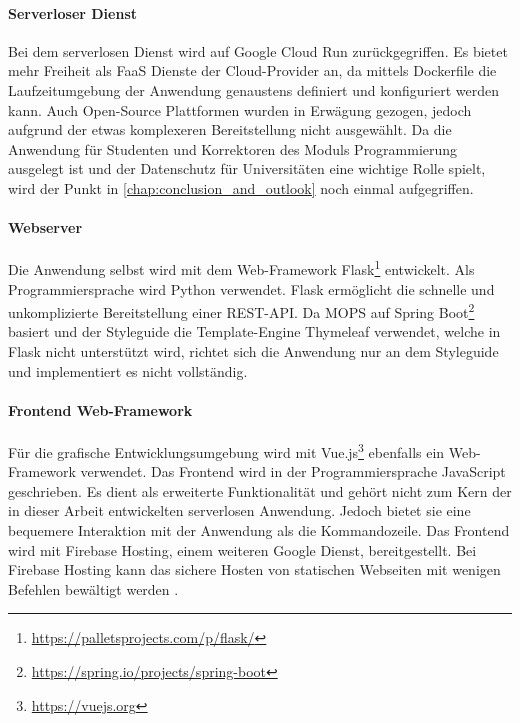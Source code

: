 \paragraph{Serverloser Dienst} Bei dem serverlosen Dienst wird auf Google Cloud Run zurückgegriffen.
Es bietet mehr Freiheit als FaaS Dienste der Cloud-Provider an, da mittels Dockerfile die Laufzeitumgebung
der Anwendung genaustens definiert und konfiguriert werden kann. Auch Open-Source
Plattformen wurden in Erwägung gezogen, jedoch aufgrund der etwas komplexeren Bereitstellung nicht ausgewählt.
Da die Anwendung für Studenten und Korrektoren
des Moduls Programmierung ausgelegt ist und der Datenschutz für Universitäten eine wichtige Rolle
spielt, wird der Punkt in \autoref{chap:conclusion_and_outlook} noch einmal aufgegriffen.

\paragraph{Webserver} Die Anwendung selbst wird mit dem Web-Framework
Flask\footnote{\url{https://palletsprojects.com/p/flask/}}
entwickelt. Als Programmiersprache wird Python verwendet.
Flask ermöglicht die schnelle und unkomplizierte Bereitstellung einer REST-API.
Da MOPS auf Spring Boot\footnote{\url{https://spring.io/projects/spring-boot}} basiert und
der Styleguide die Template-Engine Thymeleaf verwendet, welche in Flask nicht unterstützt wird,
richtet sich die Anwendung nur an dem Styleguide und implementiert es nicht vollständig.

\paragraph{Frontend Web-Framework} Für die grafische Entwicklungsumgebung
wird mit Vue.js\footnote{\url{https://vuejs.org}} ebenfalls ein Web-Framework verwendet.
Das Frontend wird in der Programmiersprache JavaScript geschrieben. Es dient als
erweiterte Funktionalität und gehört nicht zum Kern der in dieser Arbeit entwickelten
serverlosen Anwendung. Jedoch bietet sie eine bequemere Interaktion mit der Anwendung als
die Kommandozeile. Das Frontend wird mit
Firebase Hosting, einem weiteren Google Dienst,
bereitgestellt. Bei Firebase Hosting kann das sichere Hosten von statischen Webseiten
mit wenigen Befehlen bewältigt werden \cite{FirebaseHosting}.

